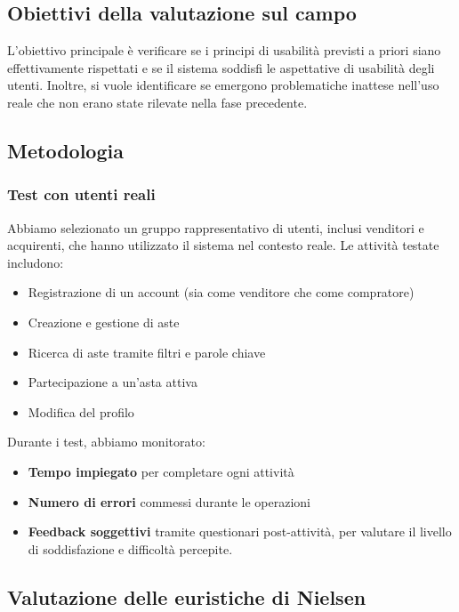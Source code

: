 \subsection{Obiettivi della valutazione sul campo}

L'obiettivo principale è verificare se i principi di usabilità previsti a priori siano effettivamente rispettati e se il sistema soddisfi le aspettative di usabilità degli utenti. Inoltre, si vuole identificare se emergono problematiche inattese nell'uso reale che non erano state rilevate nella fase precedente.

\subsection{Metodologia}

\subsubsection{Test con utenti reali}
Abbiamo selezionato un gruppo rappresentativo di utenti, inclusi venditori e acquirenti, che hanno utilizzato il sistema nel contesto reale. Le attività testate includono:
\begin{itemize}
    \item Registrazione di un account (sia come venditore che come compratore)
    \item Creazione e gestione di aste
    \item Ricerca di aste tramite filtri e parole chiave
    \item Partecipazione a un'asta attiva
    \item Modifica del profilo
\end{itemize}

\noindent
Durante i test, abbiamo monitorato:
\begin{itemize}
    \item \textbf{Tempo impiegato} per completare ogni attività
    \item \textbf{Numero di errori} commessi durante le operazioni
    \item \textbf{Feedback soggettivi} tramite questionari post-attività, per valutare il livello di soddisfazione e difficoltà percepite.
\end{itemize}

\subsection{Valutazione delle euristiche di Nielsen}

